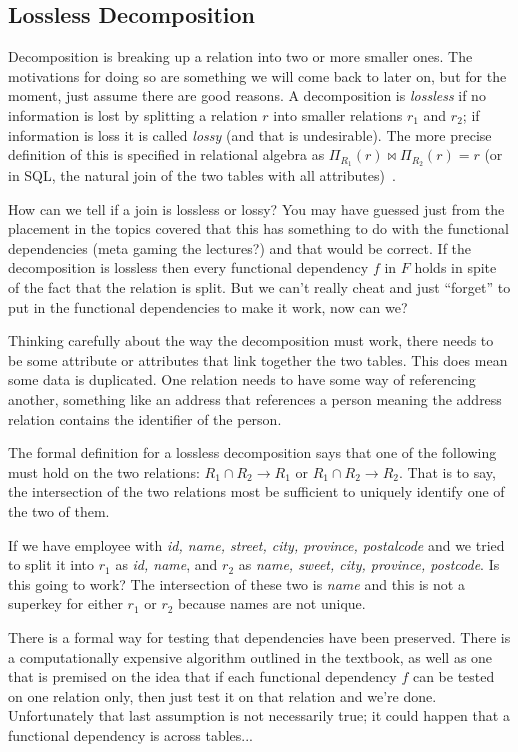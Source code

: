 \subsection*{Lossless Decomposition}

Decomposition is breaking up a relation into two or more smaller ones. The motivations for doing so are something we will come back to later on, but for the moment, just assume there are good reasons. A decomposition is \textit{lossless} if no information is lost by splitting a relation $r$ into smaller relations $r_{1}$ and $r_{2}$; if information is loss it is called \textit{lossy} (and that is undesirable). The more precise definition of this is specified in relational algebra as $\Pi_{R_{1}}(r) \bowtie \Pi_{R_{2}}(r) = r$ (or in SQL, the natural join of the two tables with all attributes)~\cite{dsc}. 

How can we tell if a join is lossless or lossy? You may have guessed just from the placement in the topics covered that this has something to do with the functional dependencies (meta gaming the lectures?) and that would be correct. If the decomposition is lossless then every functional dependency $f$ in $F$ holds in spite of the fact that the relation is split. But we can't really cheat and just ``forget'' to put in the functional dependencies to make it work, now can we?

Thinking carefully about the way the decomposition must work, there needs to be some attribute or attributes that link together the two tables. This does mean some data is duplicated. One relation needs to have some way of referencing another, something like an address that references a person meaning the address relation contains the identifier of the person. 

The formal definition for a lossless decomposition says that one of the following must hold on the two relations: $R_{1} \cap R_{2} \rightarrow R_{1}$ or  $R_{1} \cap R_{2} \rightarrow R_{2}$. That is to say, the intersection of the two relations most be sufficient to uniquely identify one of the two of them. 

If we have employee with \textit{id, name, street, city, province, postalcode} and we tried to split it into $r_{1}$ as \textit{id, name}, and $r_{2}$ as \textit{name, sweet, city, province, postcode}. Is this going to work? The intersection of these two is \textit{name} and this is not a superkey for either $r_{1}$ or $r_{2}$ because names are not unique.

There is a formal way for testing that dependencies have been preserved. There is a computationally expensive algorithm outlined in the textbook, as well as one that is premised on the idea that if each functional dependency $f$ can be tested on one relation only, then just test it on that relation and we're done. Unfortunately that last assumption is not necessarily true; it could happen that a functional dependency is across tables...

